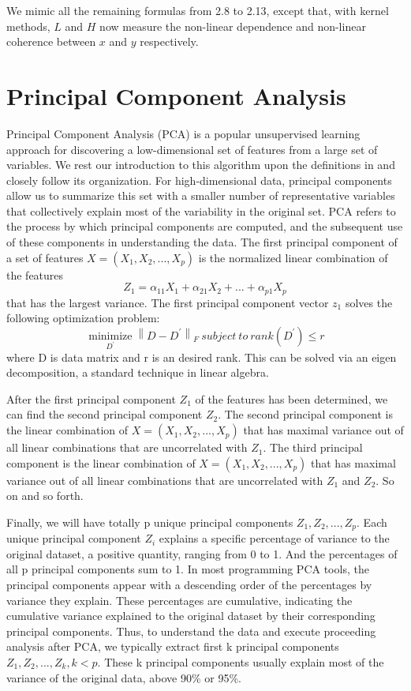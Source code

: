 \documentclass[12pt]{report} %
\newcommand{\norm}[1]{\left\lVert #1 \right\rVert}
\begin{document}
We mimic all the remaining formulas from 2.8 to 2.13, except that, with kernel methods, $L$ and $H$ now measure the non-linear dependence and non-linear coherence between $x$ and $y$ respectively.

\section{Principal Component Analysis}
Principal Component Analysis (PCA) is a popular unsupervised learning approach for discovering a low-dimensional set of features from a large set of variables. We rest our introduction to this algorithm upon the definitions in \cite{STAT} and closely follow its organization. For high-dimensional data, principal components allow us to summarize this set with a smaller number of representative variables that collectively explain most of the variability in the original set. PCA refers to the process by which principal components are computed, and the subsequent use of these components in understanding the data. The first principal component of a set of features \(X = (X_{1}, X_{2},..., X_{p})\) is the normalized linear combination of the features
\begin{equation}
Z_{1} = \alpha_{11}X_{1} + \alpha_{21}X_{2} +...+ \alpha_{p1}X_{p}
\end{equation}
that has the largest variance. The first principal component vector $z_1$ solves the following optimization problem:
\begin{equation}
\operatorname*{minimize}_{D^{'}} \norm{D-D^{'}}_F \ subject \ to \ rank(D^{'})\leq r
\end{equation}
where D is data matrix and r is an desired rank. This can be solved via an eigen decomposition, a standard technique in linear algebra.

After the first principal component \(Z_{1}\) of the features has been determined, we can find the second principal component \(Z_{2}\). The second principal component is the linear combination of \(X = (X_{1}, X_{2},..., X_{p})\) that has maximal variance out of all linear combinations that are uncorrelated with \(Z_{1}\). The third principal component is the linear combination of \(X = (X_{1}, X_{2},..., X_{p})\) that has maximal variance out of all linear combinations that are uncorrelated with \(Z_{1}\) and \(Z_{2}\). So on and so forth. 

Finally, we will have totally p unique principal components \(Z_{1}, Z_{2},..., Z_{p}\). Each unique principal component \(Z_{i}\) explains a specific percentage of variance to the original dataset, a positive quantity, ranging from 0 to 1. And the percentages of all p principal components sum to 1. In most programming PCA tools, the principal components appear with a descending order of the percentages by variance they explain. These percentages are cumulative, indicating the cumulative variance explained to the original dataset by their corresponding principal components. Thus, to understand the data and execute proceeding analysis after PCA, we typically extract first k principal components \(Z_{1}, Z_{2},..., Z_{k}, k <p \). These k principal components usually explain most of the variance of the original data, above 90\% or 95\%.
\end{document}
